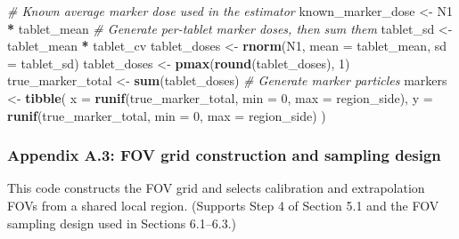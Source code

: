 \documentclass[
  12pt,
]{article}
\newenvironment{Shaded}{\begin{snugshade}}{\end{snugshade}}
\newcommand{\AttributeTok}[1]{\textcolor[rgb]{0.13,0.29,0.53}{#1}}
\newcommand{\CommentTok}[1]{\textcolor[rgb]{0.56,0.35,0.01}{\textit{#1}}}
\newcommand{\DecValTok}[1]{\textcolor[rgb]{0.00,0.00,0.81}{#1}}
\newcommand{\FunctionTok}[1]{\textcolor[rgb]{0.13,0.29,0.53}{\textbf{#1}}}
\newcommand{\NormalTok}[1]{#1}
\newcommand{\OtherTok}[1]{\textcolor[rgb]{0.56,0.35,0.01}{#1}}
\newcommand{\SpecialCharTok}[1]{\textcolor[rgb]{0.81,0.36,0.00}{\textbf{#1}}}
\begin{document}
\begin{Shaded}
\begin{Highlighting}[]
  \CommentTok{\# Known average marker dose used in the estimator}
\NormalTok{  known\_marker\_dose }\OtherTok{\textless{}{-}}\NormalTok{ N1 }\SpecialCharTok{*}\NormalTok{ tablet\_mean}
  \CommentTok{\# Generate per{-}tablet marker doses, then sum them}
\NormalTok{  tablet\_sd }\OtherTok{\textless{}{-}}\NormalTok{ tablet\_mean }\SpecialCharTok{*}\NormalTok{ tablet\_cv}
\NormalTok{  tablet\_doses }\OtherTok{\textless{}{-}} \FunctionTok{rnorm}\NormalTok{(N1, }\AttributeTok{mean =}\NormalTok{ tablet\_mean, }\AttributeTok{sd =}\NormalTok{ tablet\_sd)}
\NormalTok{  tablet\_doses }\OtherTok{\textless{}{-}} \FunctionTok{pmax}\NormalTok{(}\FunctionTok{round}\NormalTok{(tablet\_doses), }\DecValTok{1}\NormalTok{)}
\NormalTok{  true\_marker\_total }\OtherTok{\textless{}{-}} \FunctionTok{sum}\NormalTok{(tablet\_doses)}
  \CommentTok{\# Generate marker particles}
\NormalTok{  markers }\OtherTok{\textless{}{-}} \FunctionTok{tibble}\NormalTok{(}
    \AttributeTok{x =} \FunctionTok{runif}\NormalTok{(true\_marker\_total, }\AttributeTok{min =} \DecValTok{0}\NormalTok{, }\AttributeTok{max =}\NormalTok{ region\_side),}
    \AttributeTok{y =} \FunctionTok{runif}\NormalTok{(true\_marker\_total, }\AttributeTok{min =} \DecValTok{0}\NormalTok{, }\AttributeTok{max =}\NormalTok{ region\_side)}
\NormalTok{  )}
\end{Highlighting}
\end{Shaded}

\subsubsection{Appendix A.3: FOV grid construction and sampling
design}\label{appendix-a.3-fov-grid-construction-and-sampling-design}

This code constructs the FOV grid and selects calibration and
extrapolation FOVs from a shared local region. (Supports Step 4 of
Section 5.1 and the FOV sampling design used in Sections 6.1--6.3.)
\end{document}
